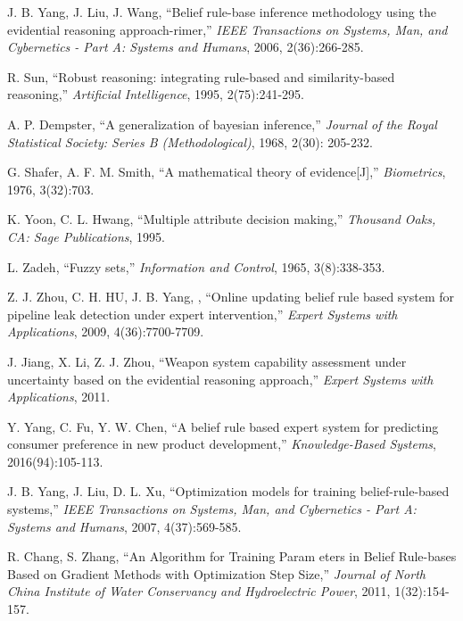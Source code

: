 \documentclass{ieeeaccess}
\begin{document}
\begin{thebibliography}{00}

     J. B. Yang, J. Liu, J. Wang, ``Belief rule-base inference methodology
    using the evidential reasoning approach-rimer,''
    \emph{IEEE Transactions on Systems, Man, and Cybernetics - Part A: Systems and Humans},
    2006, 2(36):266-285.

     R. Sun, ``Robust reasoning: integrating rule-based and similarity-based
    reasoning,'' \emph{Artificial Intelligence},
    1995, 2(75):241-295.

      A. P. Dempster, ``A generalization of bayesian inference,''
    \emph{Journal of the Royal Statistical Society: Series B (Methodological)},
    1968, 2(30): 205-232.

     G. Shafer, A. F. M. Smith, ``A mathematical theory of evidence[J],''
    \emph{Biometrics},
    1976, 3(32):703.

     K. Yoon, C. L. Hwang, ``Multiple attribute decision making,''
    \emph{Thousand Oaks, CA: Sage Publications},
    1995.

     L. Zadeh, ``Fuzzy sets,''
    \emph{Information and Control},
    1965, 3(8):338-353.

     Z. J. Zhou, C. H. HU, J. B. Yang, , ``Online updating belief rule based
    system for pipeline leak detection under expert intervention,''
    \emph{Expert Systems with Applications},
    2009, 4(36):7700-7709.

     J. Jiang, X. Li, Z. J. Zhou, ``Weapon system capability assessment
    under uncertainty based on the evidential reasoning approach,''
    \emph{Expert Systems with Applications},
    2011.

     Y. Yang, C. Fu, Y. W. Chen, ``A belief rule based expert system
    for predicting consumer preference in new product development,''
    \emph{Knowledge-Based Systems},
    2016(94):105-113.

     J. B. Yang, J. Liu, D. L. Xu, ``Optimization models for training
    belief-rule-based systems,''
    \emph{IEEE Transactions on Systems, Man, and Cybernetics - Part A: Systems and Humans},
    2007, 4(37):569-585.

     R. Chang, S. Zhang, ``An Algorithm for Training Param eters in Belief Rule-bases Based on
    Gradient Methods with Optimization Step Size,''
    \emph{Journal of North China Institute of Water Conservancy and Hydroelectric Power},
    2011, 1(32):154-157.


\end{thebibliography}
\end{document}
